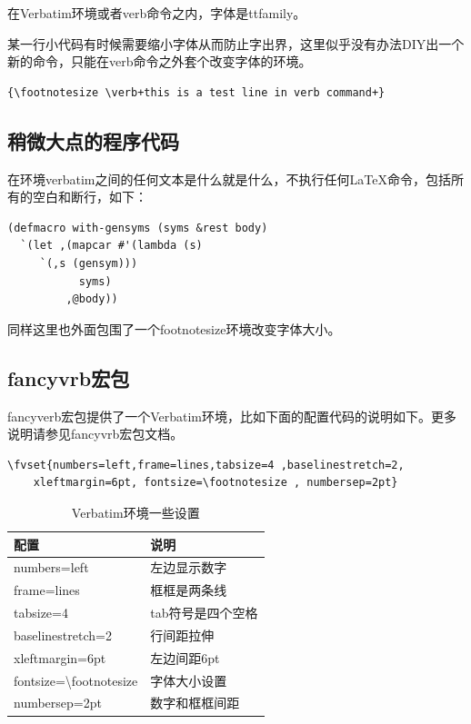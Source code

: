 \documentclass[12pt,oneside]{book}
\begin{document}
\begin{common-format}
在Verbatim环境或者verb命令之内，字体是ttfamily。

某一行小代码有时候需要缩小字体从而防止字出界，这里似乎没有办法DIY出一个新的命令，只能在verb命令之外套个改变字体的环境。
\begin{Verbatim}
{\footnotesize \verb+this is a test line in verb command+}
\end{Verbatim}



\subsection{稍微大点的程序代码}
在环境verbatim之间的任何文本是什么就是什么，不执行任何\LaTeX 命令，包括所有的空白和断行，如下：
\begin{footnotesize}
\begin{verbatim}
(defmacro with-gensyms (syms &rest body)
  `(let ,(mapcar #'(lambda (s)
     `(,s (gensym)))
           syms)
         ,@body))
\end{verbatim}
\end{footnotesize}
同样这里也外面包围了一个footnotesize环境改变字体大小。


\subsection{fancyvrb宏包}
fancyverb宏包提供了一个Verbatim环境，比如下面的配置代码的说明如下。更多说明请参见fancyvrb宏包文档。
\begin{Verbatim}
\fvset{numbers=left,frame=lines,tabsize=4 ,baselinestretch=2,
    xleftmargin=6pt, fontsize=\footnotesize , numbersep=2pt}
\end{Verbatim}

\begin{table}[H]
\centering
\caption{Verbatim环境一些设置}
\label{tab:Verbatim环境一些设置}
\medskip 
\begin{tabular}{@{}ll@{}}
\toprule
配置                        & 说明     \\ \midrule
numbers=left                         & 左边显示数字     \\
frame=lines                          & 框框是两条线     \\
tabsize=4                            & tab符号是四个空格 \\
baselinestretch=2                    & 行间距拉伸      \\
xleftmargin=6pt                      & 左边间距6pt    \\
fontsize=\textbackslash footnotesize & 字体大小设置     \\  
numbersep=2pt                        & 数字和框框间距 \\   \bottomrule
\end{tabular}
\end{table}



\end{common-format}
\end{document}
